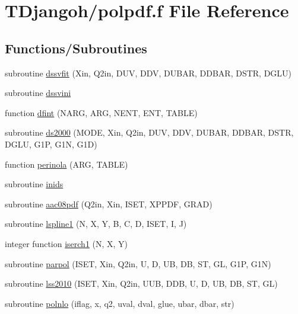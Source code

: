 \hypertarget{polpdf_8f}{\section{T\+Djangoh/polpdf.f File Reference}
\label{polpdf_8f}
}
\subsection*{Functions/\+Subroutines}
\begin{DoxyCompactItemize}
\item 
subroutine \hyperlink{polpdf_8f_afd1d368d6ebb9dd0fcff81eb028cc399}{dssvfit} (Xin, Q2in, D\+U\+V, D\+D\+V, D\+U\+B\+A\+R, D\+D\+B\+A\+R, D\+S\+T\+R, D\+G\+L\+U)
\item 
subroutine \hyperlink{polpdf_8f_a8e5f4c994c415921488124afc5dbf6d2}{dssvini}
\item 
function \hyperlink{polpdf_8f_ab97fb05f575804d70f2f4cc11b7a6396}{dfint} (N\+A\+R\+G, A\+R\+G, N\+E\+N\+T, E\+N\+T, T\+A\+B\+L\+E)
\item 
subroutine \hyperlink{polpdf_8f_ac537a7e2b44b985b2c5e2083c9fa7742}{ds2000} (M\+O\+D\+E, Xin, Q2in, D\+U\+V, D\+D\+V, D\+U\+B\+A\+R, D\+D\+B\+A\+R, D\+S\+T\+R, D\+G\+L\+U, G1\+P, G1\+N, G1\+D)
\item 
function \hyperlink{polpdf_8f_ac1559ba9c27197fb573cafd2d02ef288}{perinola} (A\+R\+G, T\+A\+B\+L\+E)
\item 
subroutine \hyperlink{polpdf_8f_a82b9b5d0217f872886739ce7c7755b92}{inids}
\item 
subroutine \hyperlink{polpdf_8f_abe9f73d8c98e5c5d6f644094fbc6625e}{aac08pdf} (Q2in, Xin, I\+S\+E\+T, X\+P\+P\+D\+F, G\+R\+A\+D)
\item 
subroutine \hyperlink{polpdf_8f_ac48cf37e34263c0e1d5ba2793fbccfc3}{lspline1} (N, X, Y, B, C, D, I\+S\+E\+T, I, J)
\item 
integer function \hyperlink{polpdf_8f_a5094e398279bf345f2c4628fcb666b9f}{iserch1} (N, X, Y)
\item 
subroutine \hyperlink{polpdf_8f_a8974471cdf7a32a43361f0ed8aada457}{parpol} (I\+S\+E\+T, Xin, Q2in, U, D, U\+B, D\+B, S\+T, G\+L, G1\+P, G1\+N)
\item 
subroutine \hyperlink{polpdf_8f_a931f3251bea4fe7a36354658de6802ef}{lss2010} (I\+S\+E\+T, Xin, Q2in, U\+U\+B, D\+D\+B, U, D, U\+B, D\+B, S\+T, G\+L)
\item 
subroutine \hyperlink{polpdf_8f_ae26fa03871621906a70975a835a4ee85}{polnlo} (iflag, x, q2, uval, dval, glue, ubar, dbar, str)

\end{DoxyCompactItemize}
